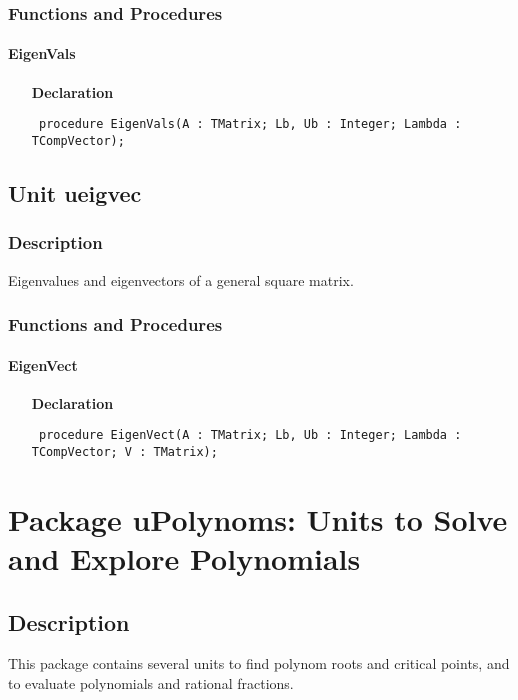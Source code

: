 \documentclass[12pt,a4paper,oneside]{report}
\newcommand{\declarationitem}[1]{\textbf{#1}}
\newcommand{\code}[1]{\texttt{#1}}
\begin{document}
\subsection{Functions and Procedures}
\subsubsection{EigenVals}
\label{ueigval-EigenVals}
\begin{itemize}\item[\declarationitem{Declaration}\hfill]
	\begin{flushleft}
		\code{
			procedure EigenVals(A : TMatrix; Lb, Ub : Integer; Lambda : TCompVector);}
		
	\end{flushleft}
	
\end{itemize}
\section{Unit ueigvec}
\label{ueigvec}
\subsection{Description}
Eigenvalues and eigenvectors of a general square matrix. 
\subsection{Functions and Procedures}
\subsubsection{EigenVect}
\label{ueigvec-EigenVect}
\begin{itemize}\item[\declarationitem{Declaration}\hfill]
	\begin{flushleft}
		\code{
			procedure EigenVect(A : TMatrix; Lb, Ub : Integer; Lambda : TCompVector; V : TMatrix);}
		
	\end{flushleft}
	
\end{itemize}
\chapter{Package uPolynoms: Units to Solve and Explore Polynomials}\label{package-upolynoms}
\section{Description}
This package contains several units to find polynom roots and critical points, and to evaluate polynomials and rational fractions.
\end{document}
